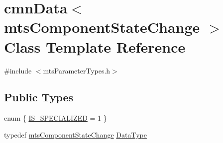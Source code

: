 \hypertarget{classcmn_data_3_01mts_component_state_change_01_4}{\section{cmn\-Data$<$ mts\-Component\-State\-Change $>$ Class Template Reference}
\label{classcmn_data_3_01mts_component_state_change_01_4}
}


{\ttfamily \#include $<$mts\-Parameter\-Types.\-h$>$}

\subsection*{Public Types}
\begin{DoxyCompactItemize}
\item 
enum \{ \hyperlink{classcmn_data_3_01mts_component_state_change_01_4_a0104782860a71034155caf5a72189ceea1efff37d8dc1f83f29604a6958a4eb8d}{I\-S\-\_\-\-S\-P\-E\-C\-I\-A\-L\-I\-Z\-E\-D} = 1
 \}
\item 
typedef \hyperlink{classmts_component_state_change}{mts\-Component\-State\-Change} \hyperlink{classcmn_data_3_01mts_component_state_change_01_4_ac0a63a5c1053b74da61e82e08c0a5d7b}{Data\-Type}
\end{DoxyCompactItemize}

